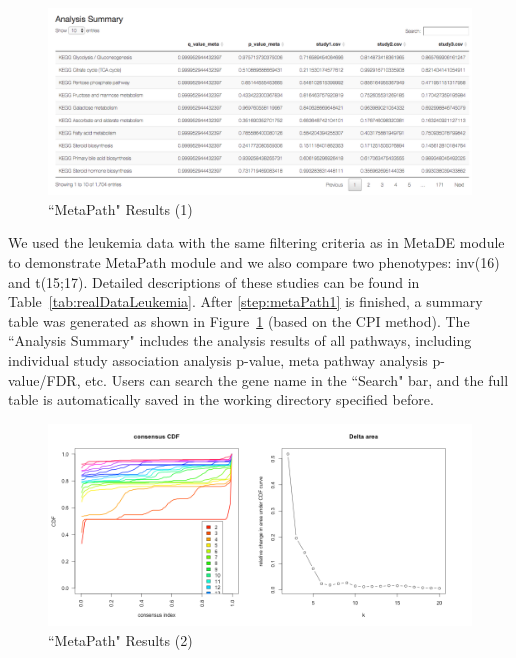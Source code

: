 \begin{figure}[H]
\begin{center}
\includegraphics[scale=0.4]{./figure/metaPath/metaPathresult1.png}
\caption{``MetaPath" Results (1)}
\label{fig:MetaPathresult1}
\end{center}
\end{figure}

We used the leukemia data with the same filtering criteria as in MetaDE module to demonstrate MetaPath module and we also compare two phenotypes: inv(16) and t(15;17).
Detailed descriptions of these studies can be found in Table~\ref{tab:realDataLeukemia}. 
After \ref{step:metaPath1} is finished, a summary table was generated as shown in Figure~\ref{fig:MetaPathresult1} (based on the CPI method). The ``Analysis Summary" includes the analysis results of all pathways, including individual study association analysis p-value, meta pathway analysis p-value/FDR, etc. Users can search the gene name in the ``Search" bar, and the full table is automatically saved in the working directory specified before.  

\begin{figure}[H]
\begin{center}
\includegraphics[scale=0.5]{./figure/metaPath/metaPathresult2.png}
\caption{``MetaPath" Results (2)}
\label{fig:MetaPathresult2}
\end{center}
\end{figure}

